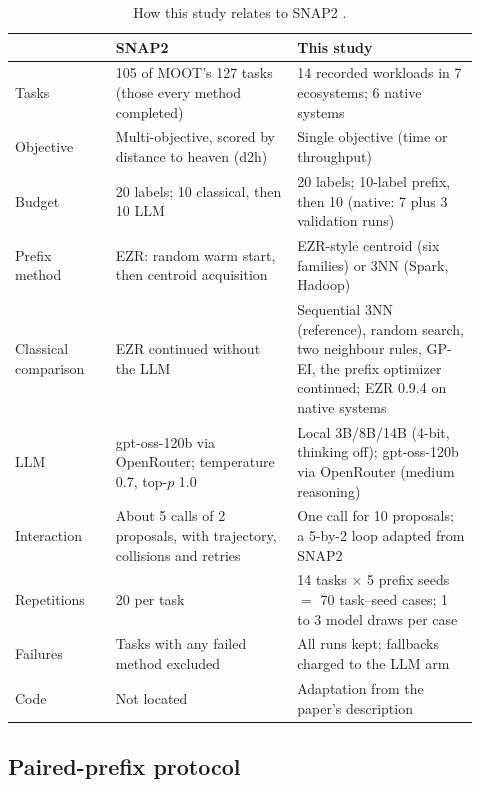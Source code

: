 \begin{table}[t]
\centering
\caption{How this study relates to SNAP2 \cite{srinivasan2026snap2}.}
\label{tab:snap2}
\small
\begin{tabular}{p{0.2\linewidth}p{0.36\linewidth}p{0.36\linewidth}}
\toprule
 & SNAP2 & This study \\
\midrule
Tasks & 105 of MOOT's 127 tasks (those every method completed) & 14 recorded workloads in 7 ecosystems; 6 native systems \\
Objective & Multi-objective, scored by distance to heaven (d2h) & Single objective (time or throughput) \\
Budget & 20 labels; 10 classical, then 10 LLM & 20 labels; 10-label prefix, then 10 (native: 7 plus 3 validation runs) \\
Prefix method & EZR: random warm start, then centroid acquisition & EZR-style centroid (six families) or 3NN (Spark, Hadoop) \\
Classical comparison & EZR continued without the LLM & Sequential 3NN (reference), random search, two neighbour rules, GP-EI, the prefix optimizer continued; EZR 0.9.4 on native systems \\
LLM & gpt-oss-120b via OpenRouter; temperature 0.7, top-$p$ 1.0 & Local 3B/8B/14B (4-bit, thinking off); gpt-oss-120b via OpenRouter (medium reasoning) \\
Interaction & About 5 calls of 2 proposals, with trajectory, collisions and retries & One call for 10 proposals; a 5-by-2 loop adapted from SNAP2 \\
Repetitions & 20 per task & 14 tasks $\times$ 5 prefix seeds $=$ 70 task--seed cases; 1 to 3 model draws per case \\
Failures & Tasks with any failed method excluded & All runs kept; fallbacks charged to the LLM arm \\
Code & Not located & Adaptation from the paper's description \\
\bottomrule
\end{tabular}
\end{table}

\subsection{Paired-prefix protocol}

